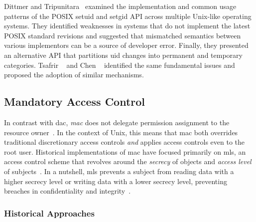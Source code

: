 Dittmer and Tripunitara~\cite{dittmer2014_setuid} examined the implementation and common
usage patterns of the POSIX setuid and setgid API across multiple Unix-like operating
systems. They identified weaknesses in systems that do not implement the latest POSIX
standard revisions and suggested that mismatched semantics between various implementors
can be a source of developer error. Finally, they presented an alternative API that
partitions \gls{uid} changes into permanent and temporary categories. Tsafrir
\etal~\cite{tsafrir2008_setuid} and Chen \etal~\cite{chen2002_setuid} identified the same
fundamental issues and proposed the adoption of similar mechanisms.


%



\subsection{Mandatory Access Control}%
\label{ss:mac}

In contrast with \gls{dac}, \textit{\gls{mac}} does not delegate permission assignment to
the resource owner~\cite{spencer1999_flask, van_oorschot2020_tools_jewels,
jaeger2008_os_security}. In the context of Unix, this means that \gls{mac} both overrides
traditional discretionary access controls \textit{and} applies access controls even to the
root user. Historical implementations of \gls{mac} have focused primarily on \gls{mls}, an
access control scheme that revolves around the \textit{secrecy} of objects and
\textit{access level} of subjects~\cite{bell2005_blp}. In a nutshell, \gls{mls} prevents
a subject from reading data with a higher secrecy level or writing data with a lower
secrecy level, preventing breaches in confidentiality and
integrity~\cite{jaeger2008_os_security}.

\subsubsection*{Historical Approaches}

